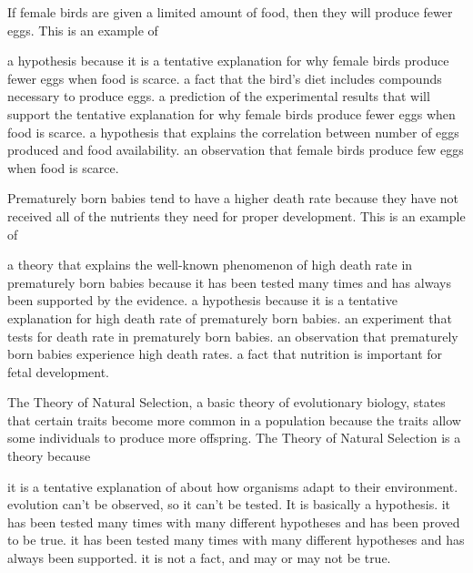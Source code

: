 \newpage

\question
If female birds are given a limited amount of food, then they will produce fewer eggs.  This is an example of

\begin{choices}
\choice a hypothesis because it is a tentative explanation for why female birds produce fewer eggs when food is scarce.
\choice a fact that the bird's diet includes compounds necessary to produce eggs.
\correctchoice a prediction of the experimental results that will support the tentative explanation for why female birds produce fewer eggs when food is scarce.
\choice a hypothesis that explains the correlation between number of eggs produced and food availability.
\choice an observation that female birds produce few eggs when food is scarce.
\end{choices}

\question
Prematurely born babies tend to have a higher death rate because they have not received all of the nutrients they need for proper development. This is an example of

\begin{choices}
\choice a theory that explains the well-known phenomenon of high death rate in prematurely born babies because it has been tested many times and has always been supported by the evidence.
\correctchoice a hypothesis because it is a tentative explanation for high death rate of prematurely born babies.
\choice an experiment that tests for death rate in prematurely born babies.
\choice an observation that prematurely born babies experience high death rates.
\choice a fact that nutrition is important for fetal development.
\end{choices}

\question
The Theory of Natural Selection, a basic theory of evolutionary biology, states that certain traits become more common in a population because the traits allow some individuals to produce more offspring. The Theory of Natural Selection is a theory because

\begin{choices}
\choice it is a tentative explanation of about how organisms adapt to their environment.
\choice evolution can't be observed, so it can't be tested. It is basically a hypothesis.
\choice it has been tested many times with many different hypotheses and has been proved to be true.
\correctchoice it has been tested many times with many different hypotheses and has always been supported.
\choice it is not a fact, and may or may not be true.
\end{choices}

